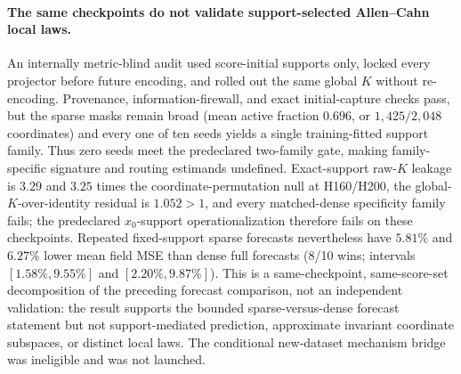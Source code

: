 \documentclass[11pt]{article}
\begin{document}
\paragraph{The same checkpoints do not validate support-selected Allen--Cahn local laws.}
An internally metric-blind audit used score-initial supports only, locked every
projector before future encoding, and rolled out the same global \(K\) without
re-encoding. Provenance, information-firewall, and exact initial-capture
checks pass, but the sparse masks remain broad (mean active fraction \(0.696\),
or \(1{,}425/2{,}048\) coordinates) and every one of ten seeds yields a single
training-fitted support family. Thus zero seeds meet the predeclared
two-family gate, making family-specific signature and routing estimands
undefined. Exact-support raw-\(K\) leakage is \(3.29\) and \(3.25\) times
the coordinate-permutation null at H160/H200, the global-\(K\)-over-identity
residual is \(1.052>1\), and every matched-dense specificity family fails; the
predeclared \(x_0\)-support operationalization therefore fails on these
checkpoints. Repeated fixed-support
sparse forecasts nevertheless have \(5.81\%\) and \(6.27\%\) lower mean field
MSE than dense full forecasts (8/10 wins; intervals
\([1.58\%,9.55\%]\) and \([2.20\%,9.87\%]\)). This is a same-checkpoint,
same-score-set decomposition of the preceding forecast comparison, not an
independent validation: the result supports the bounded sparse-versus-dense
forecast statement but not support-mediated prediction, approximate invariant
coordinate subspaces, or distinct local laws. The conditional new-dataset
mechanism bridge was ineligible and was not launched.
\end{document}
